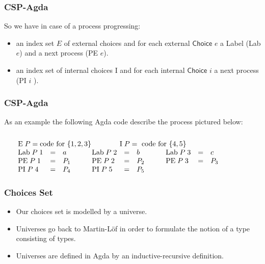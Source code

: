 \documentclass{beamer}
\newcommand{\Choice}{\mathsf{Choice}}
\newcommand{\pii}{\mathrm{PI}}
\newcommand{\pe}{\mathrm{PE}}
\newcommand{\ii}{\mathrm{I}}
\newcommand{\e}{\mathrm{E}}
\newcommand{\lab}{\mathrm{Lab}}
\newcommand{\includeXfigPictexWithoutFigure}[1]{\ifpdf
\begin{center}

\end{center}\else%
\begin{center}

\end{center}\fi}
\begin{document}
\begin{frame}
\frametitle{CSP-Agda}
So we have in case of a process progressing: 
\begin{itemize}

\item an index set $E$ of external choices and for each external $\Choice$ $e$ a Label (Lab $e$) and a next process (PE $e$).

\item an index set of internal choices I and for each internal $\Choice$ $i$ a next process (PI $i$ ).
\end{itemize}
\end{frame}







\begin{frame}
\frametitle{CSP-Agda}

As an example the following Agda code describe the process pictured below:
\[\begin{array}[t]{@{}l} 
\\
\e \; P = \mbox{code for }\{1,2,3\}\mbox{\qquad \quad \quad} \ii\; P = \mbox{ code for } \{4,5\}\\
\begin{array}[t]{@{}lclclclclcllclclclclclclclcl}
\lab \; P \;1 &=& a&\mbox{\quad} & \lab \;P\;2 &=& b &\mbox{\quad} & \lab\; P\;3 &=& c\\
\pe \; P\;1 &=& P_1&\mbox{\quad} & \pe \; P\;2 &=& P_2 &\mbox{\quad} & \pe\; P \;3 &=& P_3&
\mbox{\quad}& \\
\pii \;P\;4 &=& P_4&\mbox{\quad} & \pii \;P\;5 &=& P_5
\end{array} \end{array} \]

\includeXfigPictexWithoutFigure{exampleProcess}
\end{frame}



\begin{frame}
\frametitle{Choices Set}
\begin{itemize}

\item Our choices set is modelled by a universe. 

\item Universes go back to Martin-L{\"o}f in order to formulate the notion of a type consisting of types.

\item Universes are defined in Agda by an inductive-recursive definition.




\end{itemize}
\end{frame}
\end{document}
